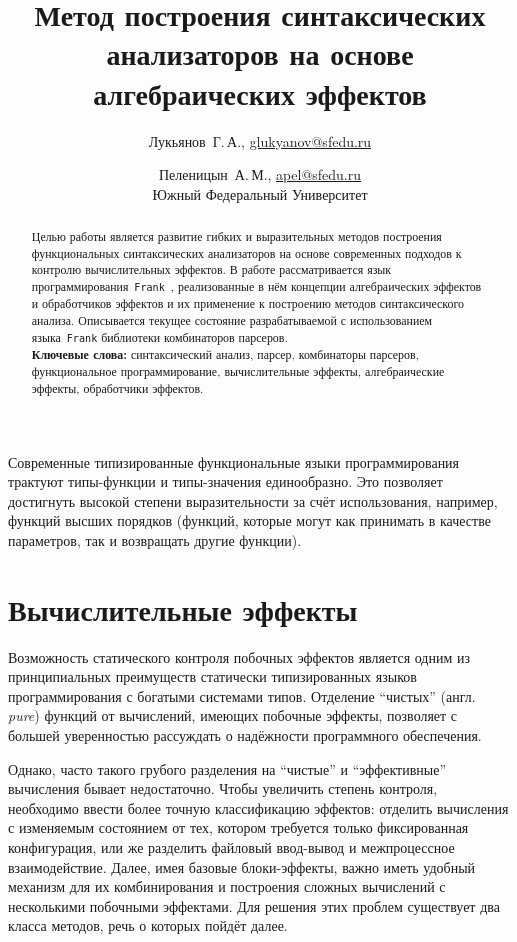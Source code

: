 \documentclass [a4paper] {article}
\title %
  {Метод построения синтаксических анализаторов
   на основе алгебраических эффектов}
\author %
{%
  Лукьянов~Г.\,А., \url {glukyanov@sfedu.ru} \and %
  Пеленицын~А.\,М., \url {apel@sfedu.ru} \\
  Южный Федеральный Университет
}%
\date {}    %
\begin{document}

\maketitle

\begin {abstract}
  Целью работы является развитие гибких и выразительных методов построения
  функциональных синтаксических анализаторов на основе современных подходов
  к контролю вычислительных эффектов. В работе рассматривается язык
  программирования~\texttt{Frank}~\cite{Frank}, реализованные в нём концепции
  алгебраических эффектов и обработчиков эффектов и их применение к построению
  методов синтаксического анализа. Описывается текущее состояние
  разрабатываемой с использованием языка~\texttt{Frank} библиотеки комбинаторов
  парсеров.
  \\ \textbf {Ключевые слова:} синтаксический анализ, парсер,
  комбинаторы парсеров, функциональное программирование, вычислительные эффекты,
  алгебраические эффекты, обработчики эффектов.
\end {abstract}

Современные типизированные функциональные языки программирования трактуют
типы-функции и типы-значения единообразно. Это позволяет достигнуть высокой
степени выразительности за счёт использования, например, функций высших
порядков (функций, которые могут как принимать в качестве параметров, так и
возвращать другие функции).

\section{Вычислительные эффекты}

Возможность статического контроля побочных эффектов является одним из
принципиальных преимуществ статически типизированных языков
программирования с богатыми системами типов. Отделение ``чистых''
(англ. \emph{pure}) функций от вычислений, имеющих побочные
эффекты, позволяет с большей уверенностью рассуждать о надёжности программного
обеспечения.

Однако, часто такого грубого разделения на ``чистые'' и ``эффективные''
вычисления бывает недостаточно. Чтобы увеличить степень контроля, необходимо
ввести более точную классификацию эффектов: отделить вычисления с изменяемым
состоянием от тех, котором требуется только фиксированная конфигурация, или же
разделить файловый ввод-вывод и межпроцессное взаимодействие. Далее, имея
базовые блоки-эффекты, важно иметь удобный механизм для их комбинирования и
построения сложных вычислений с несколькими побочными эффектами. Для решения
этих проблем существует два класса методов, речь о которых пойдёт далее.
\end{document}
